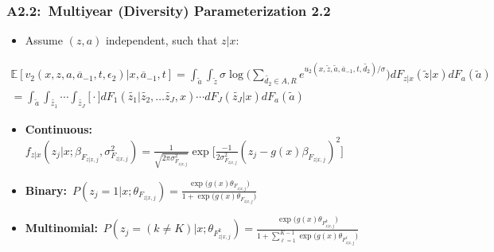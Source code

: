 \documentclass[12pt, aspectratio=169]{beamer}
\begin{document}
\begin{frame}[label=mdp22]
\frametitle{A2.2:\ Multiyear (Diversity) Parameterization 2.2}
\begin{itemize}
\item[$\bigstar$] Assume $(z,a)$ independent, such that $z|x$:
\end{itemize}
\begin{multline*}
\mathbb{E}[v_2(x,z,a,\overline{a}_{-1},t,\epsilon_2)|x,\overline{a}_{-1},t] = \int_{\widetilde a}\int_{\widetilde z}\sigma\log\bigg(\sum_{\widetilde{d_2}\in{A,R}}e^{u_2(x,\widetilde z,\widetilde a,\overline{a}_{-1},t,\widetilde{d_2})/\sigma}\bigg)dF_{z|x}(\widetilde z|x)dF_a(\widetilde a) \\
= \int_{\widetilde a}\int_{\widetilde{z_1}}\cdots\int_{\widetilde{z_J}}\bigg[\cdot\bigg]dF_1(\widetilde{z_1}|\widetilde{z_2},\dots\widetilde{z_J},x)\cdots dF_J(\widetilde{z_J}|x)dF_a(\widetilde a)
\end{multline*}
\begin{itemize}
\item \textbf{Continuous:}\ \footnotesize $f_{z|x}(z_j|x;\beta_{F_{z|x,j}},\sigma^2_{F_{z|x,j}}) = \frac{1}{\sqrt{2\pi\sigma^2_{F_{z|x,j}}}}\exp\Big[\frac{-1}{2\sigma^2_{F_{z|x,j}}}(z_j-g(x)\beta_{F_{z|x,j}})^2\Big]$ \normalsize
\item \textbf{Binary:}\ \footnotesize $P(z_j=1|x;\theta_{F_{z|x,j}}) = \frac{\exp\big(g(x)\theta_{F_{z|x,j}}\big)}{1+\exp\big(g(x)\theta_{F_{z|x,j}}\big)}$ \normalsize
\item \textbf{Multinomial:}\ \footnotesize $P(z_j=(k\neq K)|x;\theta_{F_{z|x,j}^k}) = \frac{\exp\Big(g(x)\theta_{F_{z|x,j}^k}\Big)}{1+\sum_{\ell=1}^{K-1}\exp\Big(g(x)\theta_{F_{z|x,j}^\ell}\Big)}$
\end{itemize}
\hyperlink{conc}{}
\end{frame}
\end{document}
